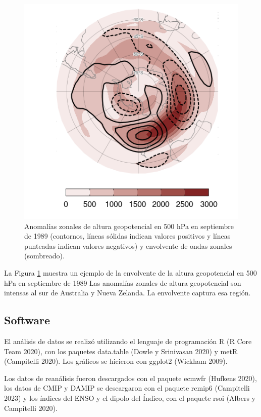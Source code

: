 \documentclass[12pt,oneside,a4paper]{reedthesis}
\begin{document}
\begin{figure}

{\centering \includegraphics{figures/15-onda3/envolvente-ejemplo-1} 

}

\caption{Anomalías zonales de altura geopotencial en 500 hPa en septiembre de 1989 (contornos, líneas sólidas indican valores positivos y líneas punteadas indican valores negativos) y envolvente de ondas zonales (sombreado).}\label{fig:envolvente-ejemplo}
\end{figure}



La Figura \ref{fig:envolvente-ejemplo} muestra un ejemplo de la envolvente de la altura geopotencial en 500 hPa en septiembre de 1989
Las anomalías zonales de altura geopotencial son intensas al sur de Australia y Nueva Zelanda.
La envolvente captura esa región.

\hypertarget{software}{%
\subsection{Software}\label{software}}

El análisis de datos se realizó utilizando el lenguaje de programación R (R Core Team 2020), con los paquetes data.table (Dowle y Srinivasan 2020) y metR (Campitelli 2020).
Los gráficos se hicieron con ggplot2 (Wickham 2009).

Los datos de reanálisis fueron descargados con el paquete ecmwfr (Hufkens 2020), los datos de CMIP y DAMIP se descargaron con el paquete rcmip6 (Campitelli 2023) y los índices del ENSO y el dipolo del Índico, con el paquete rsoi (Albers y Campitelli 2020).
\end{document}
